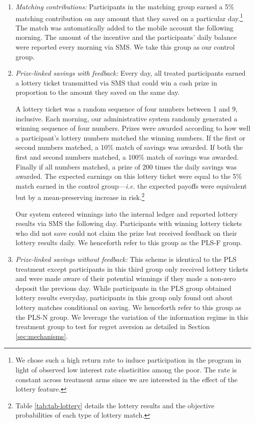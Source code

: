 \documentclass[12pt]{article}
\begin{document}
		\begin{enumerate} \setlength{\itemsep}{1pt}

			\item \textit{Matching contributions:} Participants in the matching group earned a 5\% matching contribution on any amount that they saved on a particular day.\footnote{We chose such a high return rate to induce participation in the program in light of observed low interest rate elasticities among the poor. The rate is constant across treatment arms since we are interested in the effect of the lottery feature.} The match was automatically added to the mobile account the following morning. The amount of the incentive and the participants' daily balance were reported every morning via SMS. We take this group as our control group.

			\item \textit{Prize-linked savings with feedback:} Every day, all treated participants earned a lottery ticket transmitted via SMS that could win a cash prize in proportion to the amount they saved on the same day.

			A lottery ticket was a random sequence of four numbers between 1 and 9, inclusive. Each morning, our administrative system randomly generated a winning sequence of four numbers. Prizes were awarded according to how well a participant's lottery numbers matched the winning numbers. If the first or second numbers matched, a 10\% match of savings was awarded. If both the first and second numbers matched, a 100\% match of savings was awarded. Finally if all numbers matched, a prize of 200 times the daily savings was awarded. The expected earnings on this lottery ticket were equal to the 5\% match earned in the control group---\textit{i.e.} the expected payoffs were equivalent but by a mean-preserving increase in risk.\footnote{Table \ref{tab:tab-lottery} details the lottery results and the objective probabilities of each type of lottery match.}

			Our system entered winnings into the internal ledger and reported lottery results via SMS the following day. Participants with winning lottery tickets who did not save could not claim the prize but received feedback on their lottery results daily. We henceforth refer to this group as the PLS-F group. 

			\item \textit{Prize-linked savings without feedback:} This scheme is identical to the PLS treatment except participants in this third group only received lottery tickets and were made aware of their potential winnings if they made a non-zero deposit the previous day. While participants in the PLS group obtained lottery results everyday, participants in this group only found out about lottery matches conditional on saving. We henceforth refer to this group as the PLS-N group. We leverage the variation of the information regime in this treatment group to test for regret aversion as detailed in Section \ref{sec:mechanisms}.

		\end{enumerate}
\end{document}
